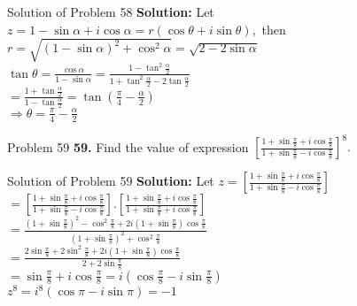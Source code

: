 \documentclass[aspectratio=169,8pt]{beamer}
\begin{document}
\begin{frame}{Solution of Problem 58}
  \textbf{Solution:} Let $z = 1 - \sin\alpha + i\cos\alpha = r(\cos\theta + i\sin\theta),$ then\\
  \vspace*{0.2cm}
  $r = \sqrt{(1 - \sin\alpha)^2 + \cos^2\alpha} = \sqrt{2 - 2\sin\alpha}$\\
  \vspace*{0.2cm}
  $\tan\theta = \frac{\cos\alpha}{1 - \sin\alpha} = \frac{1 - \tan^2\frac{\alpha}{2}}{1 + \tan^2\frac{\alpha}{2} - 2\tan\frac{\alpha}{2}}$\\
  \vspace*{0.2cm}
  $= \frac{1 + \tan\frac{\alpha}{2}}{1 - \tan\frac{\alpha}{2}} = \tan\left(\frac{\pi}{4} - \frac{\alpha}{2}\right)$\\
  \vspace*{0.2cm}
  $\Rightarrow \theta = \frac{\pi}{4} - \frac{\alpha}{2}$
\end{frame}
\begin{frame}{Problem 59}
  \textbf{59.} Find the value of expression $\left[\frac{1 + \sin\frac{\pi}{8} + i\cos\frac{\pi}{8}}{1 + \sin\frac{\pi}{8} - i\cos\frac{\pi}{8}}\right]^8.$
\end{frame}
\begin{frame}{Solution of Problem 59}
  \textbf{Solution:} Let $z = \left[\frac{1 + \sin\frac{\pi}{8} + i\cos\frac{\pi}{8}}{1 + \sin\frac{\pi}{8} - i\cos\frac{\pi}{8}}\right]$\\
  \vspace*{0.2cm}
  $= \left[\frac{1 + \sin\frac{\pi}{8} + i\cos\frac{\pi}{8}}{1 + \sin\frac{\pi}{8} - i\cos\frac{\pi}{8}}\right]. \left[\frac{1 + \sin\frac{\pi}{8} + i\cos\frac{\pi}{8}}{1 + \sin\frac{\pi}{8} + i\cos\frac{\pi}{8}}\right]$\\
  \vspace*{0.2cm}
  $= \frac{\left(1 + \sin\frac{\pi}{8}\right)^2 - \cos^2\frac{\pi}{8} + 2i(1 + \sin\frac{\pi}{8})\cos\frac{\pi}{8}}{\left(1 + \sin\frac{\pi}{8}\right)^2 + \cos^2\frac{\pi}{8}}$\\
  \vspace*{0.2cm}
  $= \frac{2\sin\frac{\pi}{8} + 2\sin^2\frac{\pi}{8} + 2i(1 + \sin\frac{\pi}{8})\cos\frac{\pi}{8}}{2 + 2\sin\frac{\pi}{8}}$\\
  \vspace*{0.2cm}
  $= \sin\frac{\pi}{8} + i\cos\frac{\pi}{8} = i\left(\cos\frac{\pi}{8} - i\sin\frac{\pi}{8}\right)$\\
  \vspace*{0.2cm}
  $z^8 = i^8(\cos\pi - i\sin\pi) = -1$
\end{frame}
\end{document}
